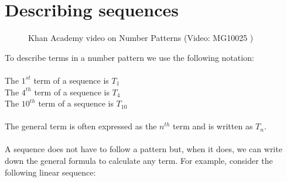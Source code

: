 \section{Describing sequences}


\setcounter{subfigure}{0}
\begin{figure}[H]
\textnormal{Khan Academy video on Number Patterns}\vspace{.1in} \nopagebreak
 { (Video:  MG10025 )}
\end{figure}       
 
To describe terms in a number pattern we use the following notation:\\
\\
The $1^{st}$ term of a sequence is $T_{1}$\\
The $4^{th}$ term of a sequence is $T_{4}$\\
The $10^{th}$ term of a sequence is $T_{10}$\\
\\
The general term is often expressed as the ${n}^{th}$ term and is written as ${T}_{n}$. \\
\\A sequence does not have to follow a pattern but, when it does, we can write down the general formula to calculate any term.
For example, consider the following linear sequence:
     
